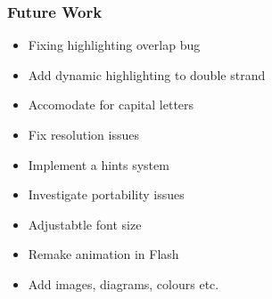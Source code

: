 \begin{frame}
\frametitle{Future Work}
\begin{itemize}
\item Fixing highlighting overlap bug
\item Add dynamic highlighting to double strand
\item Accomodate for capital letters
\item Fix resolution issues 
\item Implement a hints system
\item Investigate portability issues
\item Adjustabtle font size
\item Remake animation in Flash
\item Add images, diagrams, colours etc.
\end{itemize}
\end{frame}    


